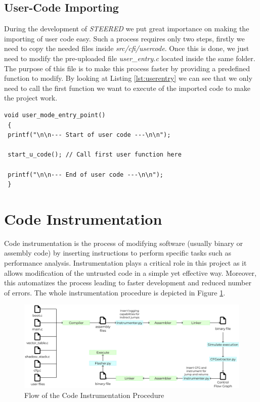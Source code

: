 \subsection{User-Code Importing}
\label{subsec:project_ucodeimport}

During the development of \textit{STEERED} we put great importance on making the
importing of user code easy. Such a process requires only two steps, firstly we
need to copy the needed files inside \textit{src/cfi/usercode}. Once this is
done, we just need to modify the pre-uploaded file \textit{user\_entry.c}
located inside the same folder. The purpose of this file is to make this process
faster by providing a predefined function to modify. By looking at Listing
\ref{lst:userentry} we can see that we only need to call the first function we
want to execute of the imported code to make the project work. \\ \begin{lstlisting}[style=CStyle, caption = \textit{user\_entry.c} File, label={lst:userentry}]
void user_mode_entry_point()
 {
 printf("\n\n--- Start of user code ---\n\n");

 start_u_code(); // Call first user function here

 printf("\n\n--- End of user code ---\n\n");
 }
\end{lstlisting}

\section{Code Instrumentation}
\label{sec:project_instrumentation}

Code instrumentation is the process of modifying software (usually binary or
assembly code) by inserting instructions to perform specific tasks such as performance
analysis. Instrumentation plays a critical role in this project as it allows
modification of the untrusted code in a simple yet effective way. Moreover, this
automatizes the process leading to faster development and reduced number of
errors. The whole instrumentation procedure is depicted in Figure \ref{fig:instrumentation}.
\\
\begin{figure}[htbp]
  \centering
  \includegraphics[width=.9\linewidth]{images/instrumentation.png}
  \caption{Flow of the Code Instrumentation Procedure}
  \label{fig:instrumentation}
\end{figure}
\\

